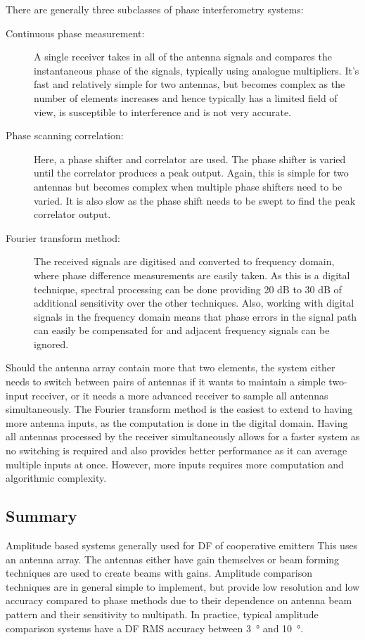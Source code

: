 There are generally three subclasses of phase interferometry systems\cite{jenkins1991smallaperture}:
\begin{description}
  \item [Continuous phase measurement:] A single receiver takes in all of the antenna signals and compares the instantaneous phase of the signals, typically using analogue multipliers. It's fast and relatively simple for two antennas, but becomes complex as the number of elements increases and hence typically has a limited field of view, is susceptible to interference and is not very accurate.
  \item [Phase scanning correlation:] Here, a phase shifter and correlator are used. The phase shifter is varied until the correlator produces a peak output. Again, this is simple for two antennas but becomes complex when multiple phase shifters need to be varied. It is also slow as the phase shift needs to be swept to find the peak correlator output.
  \item [Fourier transform method:] The received signals are digitised and converted to frequency domain, where phase difference measurements are easily taken. As this is a digital technique, spectral processing can be done providing 20 dB to 30 dB of additional sensitivity over the other techniques. Also, working with digital signals in the frequency domain means that phase errors in the signal path can easily be compensated for and adjacent frequency signals can be ignored.
\end{description}
Should the antenna array contain more that two elements, the system either needs to switch between pairs of antennas if it wants to maintain a simple two-input receiver, or it needs a more advanced receiver to sample all antennas simultaneously. The Fourier transform method is the easiest to extend to having more antenna inputs, as the computation is done in the digital domain. Having all antennas processed by the receiver simultaneously allows for a faster system as no switching is required and also provides better performance as it can average multiple inputs at once. However, more inputs requires more computation and algorithmic complexity.

\subsection{Summary}
Amplitude based systems generally used for DF of cooperative emitters \cite{jenkins1991smallaperture}
This uses an antenna array. The antennas either have gain themselves or beam forming techniques are used to create beams with gains. Amplitude comparison techniques are in general simple to implement, but provide low resolution and low accuracy compared to phase methods due to their dependence on antenna beam pattern and their sensitivity to multipath. In practice, typical amplitude comparison systems have a DF RMS accuracy between \SI{3}{\degree} and \SI{10}{\degree}.

